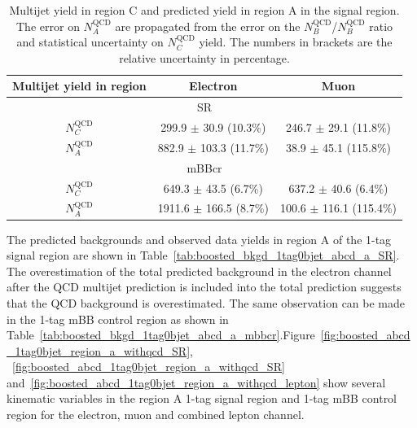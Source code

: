 \begin{table}[!htbp]
\begin{center}
\begin{tabular}{c|c|c}
Multijet yield in region & Electron & Muon  \\  
\hline
\multicolumn{3}{c}{SR} \\
\hline
$N_C^\text{QCD}$         & 299.9 $\pm$ 30.9 (10.3\%)          & 246.7 $\pm$ 29.1 (11.8\%)  \\
$N_A^\text{QCD}$         & 882.9 $\pm$ 103.3 (11.7\%)         & 38.9 $\pm$ 45.1 (115.8\%)  \\
\hline
\multicolumn{3}{c}{mBBcr} \\
\hline
$N_C^\text{QCD}$       & 649.3 $\pm$ 43.5 (6.7\%)           & 637.2 $\pm$ 40.6 (6.4\%)     \\
$N_A^\text{QCD}$       & 1911.6 $\pm$ 166.5 (8.7\%)         & 100.6 $\pm$ 116.1 (115.4\%)  \\
\hline
\end{tabular}
\end{center}
\caption{Multijet yield in region C and predicted yield in region A in the signal region. The error on $N_A^\text{QCD}$
are propagated from the error on the $N_B^\text{QCD}$/$N_B^\text{QCD}$ ratio and statistical uncertainty on $N_C^\text{QCD}$ yield.
The numbers in brackets are the relative uncertainty in percentage.} 
\label{tab:boosted_bkgd_1tag0bjet_abcd_yield}
\end{table}

The predicted backgrounds and observed data yields in region A of the 1-tag signal region are shown 
in Table~\ref{tab:boosted_bkgd_1tag0bjet_abcd_a_SR}. The overestimation of the total predicted background
in the electron channel after the QCD multijet prediction is included into the total prediction suggests
that the QCD background is overestimated. The same observation can be made in the 1-tag mBB control region as 
shown in Table~\ref{tab:boosted_bkgd_1tag0bjet_abcd_a_mbbcr}.Figure~\ref{fig:boosted_abcd_1tag0bjet_region_a_withqcd_SR},
~\ref{fig:boosted_abcd_1tag0bjet_region_a_withqcd_SR} and~\ref{fig:boosted_abcd_1tag0bjet_region_a_withqcd_lepton} show 
several kinematic variables in the region A 1-tag signal region and 1-tag mBB control region for the electron, muon and 
combined lepton channel.

